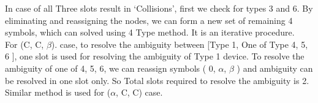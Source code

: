\documentclass[fleqn]{article}
\begin{document}
In case of all Three slots result in `Collisions', first we check for types 3 and 6. By eliminating and reassigning the nodes, we can form a new set of remaining 4 symbols, which can solved using 4 Type method. It is an iterative procedure. \\
For (C, C, $\beta$). case, to resolve the ambiguity between [Type 1, One of Type {4, 5, 6} ], one slot is used for resolving
the ambiguity of Type 1 device. To resolve the ambiguity of one of {4, 5, 6},
we can reassign symbols ( 0, $\alpha$, $\beta$ ) and ambiguity can be
resolved in one slot only. So Total slots required to resolve the ambiguity is 2. Similar method is used for ($\alpha$, C, C) case.
\end{document}
